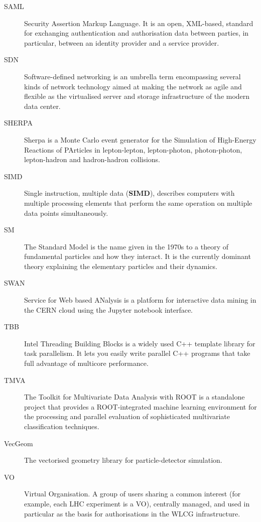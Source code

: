 \documentclass[12pt,a4paper]{article}
\begin{document}
\begin{appendices}
\begin{description}
\item[SAML] Security Assertion Markup Language. It is an open, XML-based,
standard for exchanging authentication and authorisation data between
parties, in particular, between an identity provider and a service
provider.

\item[SDN] Software-defined networking is an umbrella term encompassing several kinds of network technology aimed at making the network as agile
and flexible as the virtualised server and storage infrastructure of the modern data center.

\item[SHERPA] Sherpa is a Monte Carlo event generator for the Simulation of
High-Energy Reactions of PArticles in lepton-lepton, lepton-photon,
photon-photon, lepton-hadron and hadron-hadron collisions.

\item[SIMD] Single instruction, multiple data (\textbf{SIMD}), describes
computers with multiple processing elements that perform the same
operation on multiple data points simultaneously.

\item[SM] The Standard Model is the name given in the 1970s to a theory of
fundamental particles and how they interact. It is the currently
dominant theory explaining the elementary particles and their dynamics.

\item[SWAN] Service for Web based ANalysis is a platform for interactive data
mining in the CERN cloud using the Jupyter notebook interface.

\item[TBB] Intel Threading Building Blocks is a widely used C++ template
library for task parallelism. It lets you easily write parallel C++
programs that take full advantage of multicore performance.

\item[TMVA] The Toolkit for Multivariate Data Analysis with ROOT is a
standalone project that provides a ROOT-integrated machine learning
environment for the processing and parallel evaluation of sophisticated
multivariate classification techniques.

\item[VecGeom] The vectorised geometry library for particle-detector simulation.

\item[VO] Virtual Organisation. A group of users sharing a common interest
(for example, each LHC experiment is a VO), centrally managed, and used
in particular as the basis for authorisations in the WLCG
infrastructure.


\end{description}
\end{appendices}
\end{document}
